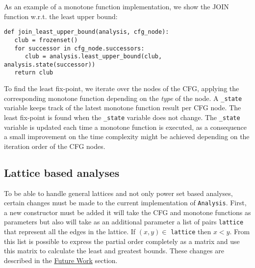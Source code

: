 As an example of a monotone function implementation, we show the JOIN function w.r.t. the least upper bound: 
\begin{verbatim}
def join_least_upper_bound(analysis, cfg_node):
   club = frozenset()
   for successor in cfg_node.successors:
      club = analysis.least_upper_bound(club, analysis.state(successor))
   return club
\end{verbatim}

\newpar To find the least fix-point, we iterate over the nodes of the CFG, applying the corresponding monotone function depending on the \emph{type} of the node. A \texttt{\_state} variable keeps track of the latest monotone function result per CFG node. The least fix-point is found when the \texttt{\_state} variable does not change. The \texttt{\_state} variable is updated each time a monotone function is executed, as a consequence a small improvement on the time complexity might be achieved depending on the iteration order of the CFG nodes.

\subsection{Lattice based analyses}
To be able to handle general lattices and not only power set based analyses, certain changes must be made to the current implementation of \texttt{Analysis}. First, a new constructor must be added it will take the CFG and monotone functions as parameters but also will take as an additional parameter a list of pairs \texttt{lattice} that represent all the edges in the lattice. If $(x,y) \in$ \texttt{lattice} then $x < y$. From this list is possible to express the partial order completely as a matrix and use this matrix to calculate the least and greatest bounds. These changes are described in the \hyperref[futurework]{Future Work} section. 


